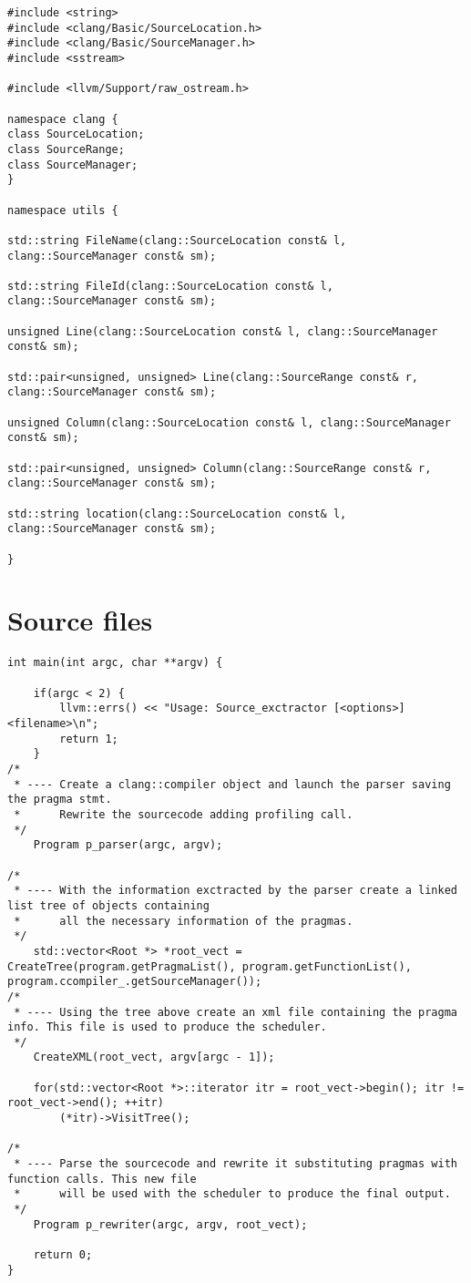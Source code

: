 \documentclass[a4paper,10pt,twoside]{book}
\begin{document}
\begin{lstlisting}[language=CCC, caption=utils/source\_locations.h]
#include <string>
#include <clang/Basic/SourceLocation.h>
#include <clang/Basic/SourceManager.h>
#include <sstream>

#include <llvm/Support/raw_ostream.h>

namespace clang {
class SourceLocation;
class SourceRange;
class SourceManager;
}

namespace utils {

std::string FileName(clang::SourceLocation const& l, clang::SourceManager const& sm);

std::string FileId(clang::SourceLocation const& l, clang::SourceManager const& sm);

unsigned Line(clang::SourceLocation const& l, clang::SourceManager const& sm);

std::pair<unsigned, unsigned> Line(clang::SourceRange const& r, clang::SourceManager const& sm);

unsigned Column(clang::SourceLocation const& l, clang::SourceManager const& sm);

std::pair<unsigned, unsigned> Column(clang::SourceRange const& r, clang::SourceManager const& sm);

std::string location(clang::SourceLocation const& l, clang::SourceManager const& sm);

}
\end{lstlisting}

\section{Source files}

\begin{lstlisting}[language=CCC, caption=main.cpp]
int main(int argc, char **argv) { 

	if(argc < 2) {
		llvm::errs() << "Usage: Source_exctractor [<options>] <filename>\n";
     	return 1;
	}
/*
 * ---- Create a clang::compiler object and launch the parser saving the pragma stmt. 
 * 		Rewrite the sourcecode adding profiling call.
 */
	Program p_parser(argc, argv);

/*
 * ---- With the information exctracted by the parser create a linked list tree of objects containing
 *		all the necessary information of the pragmas.
 */
	std::vector<Root *> *root_vect = CreateTree(program.getPragmaList(), program.getFunctionList(), program.ccompiler_.getSourceManager());
/*
 * ---- Using the tree above create an xml file containing the pragma info. This file is used to produce the scheduler.
 */
	CreateXML(root_vect, argv[argc - 1]);

	for(std::vector<Root *>::iterator itr = root_vect->begin(); itr != root_vect->end(); ++itr) 
		(*itr)->VisitTree();

/*
 * ---- Parse the sourcecode and rewrite it substituting pragmas with function calls. This new file
 * 		will be used with the scheduler to produce the final output.
 */
	Program p_rewriter(argc, argv, root_vect);

	return 0;
}
\end{lstlisting}
\end{document}
